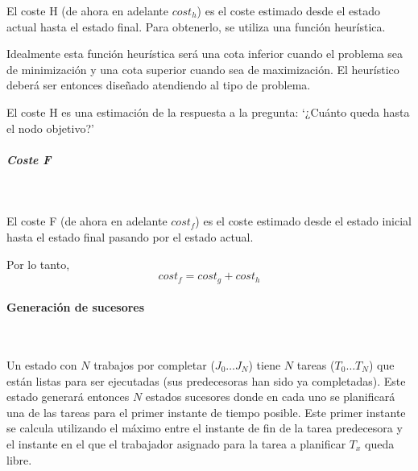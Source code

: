 El coste H (de ahora en adelante $cost_h$) es el coste estimado desde el estado actual
hasta el estado final.
Para obtenerlo, se utiliza una función heurística.

Idealmente esta función heurística será una cota inferior cuando el problema
sea de minimización y una cota superior cuando sea de maximización.
El heurístico deberá ser entonces diseñado atendiendo al tipo de problema.

\begin{keynotebox}
    El coste H es una estimación de la respuesta a la pregunta:
    `¿Cuánto queda hasta el nodo objetivo?'
\end{keynotebox}

\subparagraph{Coste F}~

El coste F (de ahora en adelante $cost_f$) es el coste estimado desde el estado inicial
hasta el estado final pasando por el estado actual.

Por lo tanto, \[cost_f = cost_g + cost_h\]

\pagebreak

\paragraph{Generación de sucesores}~

Un estado con $N$ trabajos por completar ($J_0 \dots J_N$)
tiene $N$ tareas ($T_0 \dots T_N$) que están listas para ser ejecutadas
(sus predecesoras han sido ya completadas).
Este estado generará entonces $N$ estados sucesores
donde en cada uno se planificará una de las tareas
para el primer instante de tiempo posible.
Este primer instante se calcula utilizando el
máximo entre el instante de fin de la tarea predecesora y
el instante en el que el trabajador asignado
para la tarea a planificar $T_x$ queda libre.

